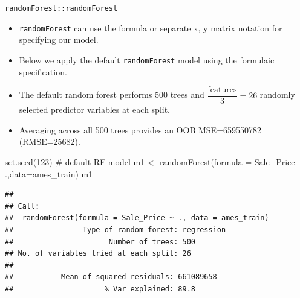 \documentclass[
  10pt,
  ignorenonframetext,
]{beamer}
\newenvironment{Shaded}{}{}
\newcommand{\CommentTok}[1]{\textcolor[rgb]{0.00,0.50,0.00}{#1}}
\newcommand{\DataTypeTok}[1]{#1}
\newcommand{\DecValTok}[1]{#1}
\newcommand{\KeywordTok}[1]{\textcolor[rgb]{0.00,0.00,1.00}{#1}}
\newcommand{\NormalTok}[1]{#1}
\newcommand{\OperatorTok}[1]{#1}
\newcommand{\StringTok}[1]{\textcolor[rgb]{0.00,0.50,0.50}{#1}}
\providecommand{\tightlist}{%
  \setlength{\itemsep}{0pt}\setlength{\parskip}{0pt}}
\begin{document}
\begin{frame}[fragile]{\texttt{randomForest::randomForest}}
\protect\hypertarget{randomforestrandomforest}{}

\begin{itemize}
\tightlist
\item
  \texttt{randomForest} can use the formula or separate x, y matrix
  notation for specifying our model.
\item
  Below we apply the default \texttt{randomForest} model using the
  formulaic specification.
\item
  The default random forest performs 500 trees and
  \(\dfrac{\text{features}}{3}=26\) randomly selected predictor
  variables at each split.
\item
  Averaging across all 500 trees provides an OOB MSE=659550782
  (RMSE=25682).
\end{itemize}

\begin{Shaded}
\begin{Highlighting}[]
\KeywordTok{set.seed}\NormalTok{(}\DecValTok{123}\NormalTok{)}
\CommentTok{# default RF model}
\NormalTok{m1 <-}\StringTok{ }\KeywordTok{randomForest}\NormalTok{(}\DataTypeTok{formula =}\NormalTok{ Sale_Price }\OperatorTok{~}\StringTok{ }\NormalTok{.,}\DataTypeTok{data=}\NormalTok{ames_train)}
\NormalTok{m1}
\end{Highlighting}
\end{Shaded}

\begin{verbatim}
## 
## Call:
##  randomForest(formula = Sale_Price ~ ., data = ames_train) 
##                Type of random forest: regression
##                      Number of trees: 500
## No. of variables tried at each split: 26
## 
##           Mean of squared residuals: 661089658
##                     % Var explained: 89.8
\end{verbatim}

\end{frame}
\end{document}
